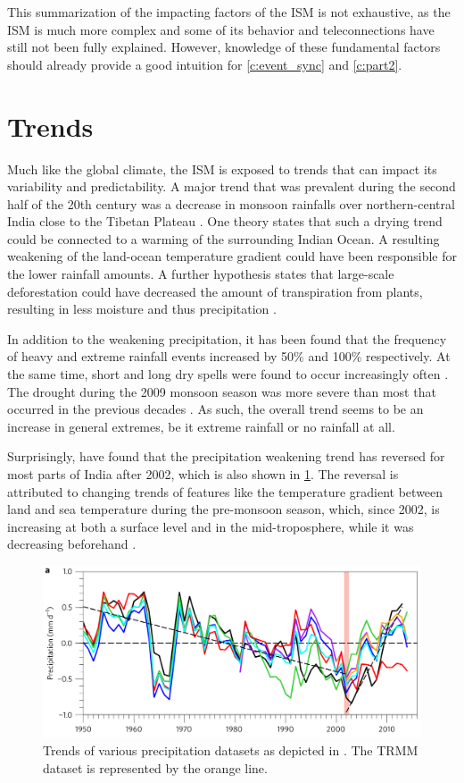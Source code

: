 This summarization of the impacting factors of the ISM is not exhaustive, as the ISM is much more complex and some of its behavior and teleconnections have still not been fully explained. However, knowledge of these fundamental factors should already provide a good intuition for \cref{c:event_sync} and \cref{c:part2}.


\section{Trends}
\label{st:ism_trends}
Much like the global climate, the ISM is exposed to trends that can impact its variability and predictability. A major trend that was prevalent during the second half of the 20th century was a decrease in monsoon rainfalls over northern-central India close to the Tibetan Plateau \citep{Jin.2017}. One theory states that such a drying trend could be connected to a warming of the surrounding Indian Ocean. A resulting weakening of the land-ocean temperature gradient could have been responsible for the lower rainfall amounts. A further hypothesis states that large-scale deforestation could have decreased the amount of transpiration from plants, resulting in less moisture and thus precipitation \citep{Jin.2017}.

In addition to the weakening precipitation, it has been found that the frequency of heavy and extreme rainfall events increased by 50\% and 100\% respectively. At the same time, short and long dry spells were found to occur increasingly often \citep{Auffhammer.2012}. The drought during the 2009 monsoon season was more severe than most that occurred in the previous decades \citep{Auffhammer.2012}. As such, the overall trend seems to be an increase in general extremes, be it extreme rainfall or no rainfall at all.

Surprisingly, \citet{Jin.2017} have found that the precipitation weakening trend has reversed for most parts of India after 2002, which is also shown in \cref{fig:precipitation_trend}. The reversal is attributed to changing trends of features like the temperature gradient between land and sea temperature during the pre-monsoon season, which, since 2002, is increasing at both a surface level and in the mid-troposphere, while it was decreasing beforehand \citep{Jin.2017}.

\begin{figure}[h]
  \centering
  \includegraphics[width=0.7\linewidth]{./99_appendix/img/precipitation_trend}
  \caption{Trends of various precipitation datasets as depicted in \citet{Jin.2017}. The TRMM dataset is represented by the orange line.}
  \label{fig:precipitation_trend}
\end{figure}


